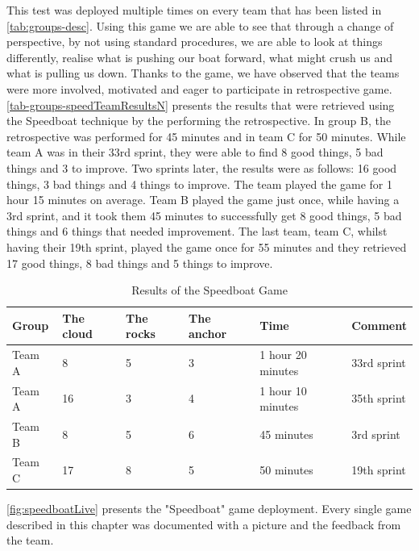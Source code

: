 This test was deployed multiple times on every team that has been listed in \autoref{tab:groups-desc}. Using this game we are able to see that through a change of perspective, by not using standard procedures, we are able to look at things differently, realise what is pushing our boat forward, what might crush us and what is pulling us down. Thanks to the game, we have observed that the teams were more involved, motivated and eager to participate in retrospective game. \autoref{tab-groups-speedTeamResultsN} presents the results that were retrieved using the Speedboat technique by the performing the retrospective. In group B, the retrospective was performed for 45 minutes and in team C for 50 minutes. While team A was in their 33rd sprint, they were able to find 8 good things, 5 bad things and 3 to improve. Two sprints later, the results were as follows: 16 good things, 3 bad things and 4 things to improve. The team played the game for 1 hour 15 minutes on average. Team B played the game just once, while having a 3rd sprint, and it took them 45 minutes to successfully get 8 good things, 5 bad things and 6 things that needed improvement. The last team, team C, whilst having their 19th sprint, played the game once for 55 minutes and they retrieved 17 good things, 8 bad things and 5 things to improve.

\begin{table}[!htbp]
	\caption{Results of the Speedboat Game}
	\label{tab:groups-speedTeamResultsN}
	\begin{tabularx}{\textwidth}{|X|X|X|X|X|X|}
	\hline
		Group &  The cloud & The rocks & The anchor & Time & Comment\\ \hline
		Team A & 8 & 5 & 3 & 1 hour 20 minutes & 33rd sprint \\ \hline
		Team A & 16 & 3 & 4 & 1 hour 10 minutes & 35th sprint\\ \hline
		Team B & 8 & 5 & 6 & 45 minutes & 3rd sprint\\ \hline
        Team C & 17 & 8 & 5 & 50 minutes & 19th sprint\\ \hline
	\end{tabularx}
\end{table}

\autoref{fig:speedboatLive} presents the "Speedboat" game deployment. Every single game described in this chapter was documented with a picture and the feedback from the team.


